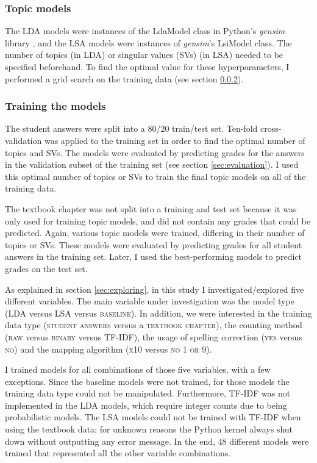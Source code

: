 \documentclass[a4paper,10pt,twoside]{article}
\begin{document}
\subsubsection{Topic models}
The LDA models were instances of the LdaModel class in Python's \textit{gensim} library \cite{rehurek2010}, and the LSA models were instances of \textit{gensim}'s LsiModel class. The number of topics (in LDA) or singular values (SVs) (in LSA) needed to be specified beforehand. To find the optimal value for these hyperparameters, I performed a grid search on the training data (see section \ref{sec:training}).

\subsubsection{Training the models}
\label{sec:training}
The student answers were split into a 80/20 train/test set. Ten-fold cross-validation was applied to the training set in order to find the optimal number of topics and SVs. The models were evaluated by predicting grades for the answers in the validation subset of the training set (see section \ref{sec:evaluation}). I used this optimal number of topics or SVs to train the final topic models on all of the training data.

The textbook chapter was not split into a training and test set because it was only used for training topic models, and did not contain any grades that could be predicted. Again, various topic models were trained, differing in their number of topics or SVs. These models were evaluated by predicting grades for all student answers in the training set. Later, I used the best-performing models to predict grades on the test set.

As explained in section \ref{sec:exploring}, in this study I investigated/explored five different variables. The main variable under investigation was the model type (LDA versus LSA versus \textsc{baseline}). In addition, we were interested in the training data type (\textsc{student answers} versus a \textsc{textbook chapter}), the counting method (\textsc{raw} versus \textsc{binary} versus TF-IDF), the usage of spelling correction (\textsc{yes} versus \textsc{no}) and the mapping algorithm (\textsc{x10} versus \textsc{no 1 or 9}).

I trained models for all combinations of those five variables, with a few exceptions. Since the baseline models were not trained, for those models the training data type could not be manipulated. Furthermore, TF-IDF was not implemented in the LDA models, which require integer counts due to being probabilistic models. The LSA models could not be trained with TF-IDF when using the textbook data; for unknown reasons the Python kernel always shut down without outputting any error message. In the end, 48 different models were trained that represented all the other variable combinations.
\end{document}
